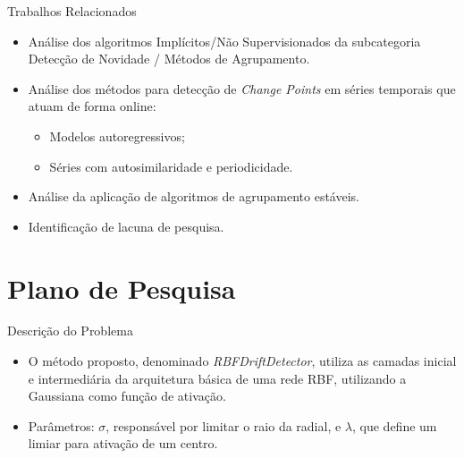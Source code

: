 \documentclass[10pt]{beamer}
\begin{document}

\begin{frame}{Trabalhos Relacionados}
    \begin{itemize}
        \item<1 -> Análise dos algoritmos \alert{Implícitos/Não Supervisionados} da subcategoria \alert{Detecção de Novidade / Métodos de Agrupamento}.
        \item<2 -> Análise dos métodos para detecção de \textit{Change Points} em séries temporais que atuam de forma online:
        \begin{itemize}
            \item<2 -> Modelos autoregressivos;
            \item<2 -> Séries com autosimilaridade e periodicidade.
        \end{itemize}
        \item<3 -> Análise da aplicação de algoritmos de agrupamento estáveis.
        \item<4 -> Identificação de lacuna de pesquisa.
      \end{itemize}
\end{frame}

\section{Plano de Pesquisa}


\begin{frame}{Descrição do Problema}
    \begin{itemize}
        \item<1 -> O método proposto, denominado \textit{RBFDriftDetector}, utiliza as camadas inicial e intermediária da arquitetura básica de uma rede RBF, utilizando a Gaussiana como função de ativação.
        \item<2 -> Parâmetros: \textit{$\sigma$}, responsável por limitar o raio da radial, e \textit{$\lambda$}, que define um limiar para ativação de um centro.
      \end{itemize}
\end{frame}
 
\end{document}
